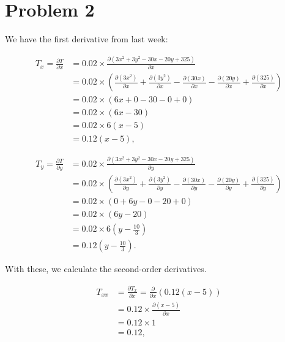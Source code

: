 \documentclass[12pt,a4paper]{article}
\begin{document}
\section*{Problem 2}
\begin{solution}
We have the first derivative from last week:

\begin{align*}
    T_x = \frac{\partial T}{\partial x} &= 0.02 \times \frac{\partial \left(3x^{2} + 3y^{2} - 30x - 20y + 325\right)}{\partial x} \\
    &= 0.02 \times \left(\frac{\partial (3x^{2})}{\partial x} + \frac{\partial (3y^{2})}{\partial x} - \frac{\partial (30x)}{\partial x} - \frac{\partial (20y)}{\partial x} + \frac{\partial (325)}{\partial x}\right) \\
    &= 0.02 \times \left(6x + 0 - 30 - 0 + 0\right) \\
    &= 0.02 \times \left(6x - 30\right) \\
    &= 0.02 \times 6(x - 5) \\
    &= 0.12(x - 5),
\end{align*}

\begin{align*}
    T_y = \frac{\partial T}{\partial y} &= 0.02 \times \frac{\partial \left(3x^{2} + 3y^{2} - 30x - 20y + 325\right)}{\partial y} \\
    &= 0.02 \times \left(\frac{\partial (3x^{2})}{\partial y} + \frac{\partial (3y^{2})}{\partial y} - \frac{\partial (30x)}{\partial y} - \frac{\partial (20y)}{\partial y} + \frac{\partial (325)}{\partial y}\right) \\
    &= 0.02 \times \left(0 + 6y - 0 - 20 + 0\right) \\
    &= 0.02 \times \left(6y - 20\right) \\
    &= 0.02 \times 6(y - \frac{10}{3}) \\
    &= 0.12(y - \frac{10}{3}).
\end{align*}

With these, we calculate the second-order derivatives.

\begin{align*}
    T_{xx} &= \frac{\partial T_x}{\partial x} = \frac{\partial}{\partial x} \left(0.12(x - 5)\right) \\
    &= 0.12 \times \frac{\partial (x - 5)}{\partial x} \\
    &= 0.12 \times 1 \\
    &= 0.12,
\end{align*}


\end{solution}
\end{document}
